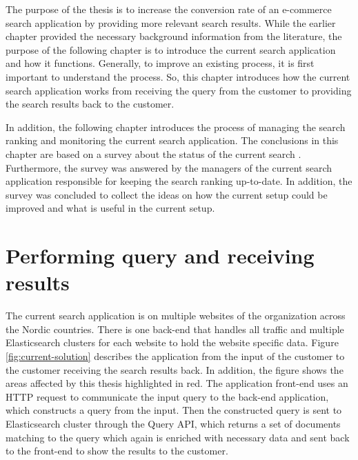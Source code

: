 
The purpose of the thesis is to increase the conversion rate of an e-commerce search application 
by providing more relevant search results. 
While the earlier chapter provided the necessary background information from the literature, the purpose
of the following chapter is to introduce the current search application and how it functions.
Generally, to improve an existing process, it is first important to understand the process. 
So, this chapter introduces how the current search application works
from receiving the query from the customer to providing the search results back to the customer. 


In addition, the following chapter introduces the process of managing 
the search ranking and monitoring the current search application.
The conclusions in this chapter are based on a survey about the status of the current search \cite{searchSurvey}.
Furthermore, the survey was answered by the managers of the current search application responsible for keeping
the search ranking up-to-date.
In addition, the survey was concluded to collect the ideas on how the current setup could be improved and 
what is useful in the current setup.


\section{Performing query and receiving results}

The current search application is on multiple websites of the organization across the Nordic countries. 
There is one back-end that handles all traffic and multiple Elasticsearch clusters for each website to 
hold the website specific data. Figure \ref{fig:current-solution} describes the application
from the input of the customer to the customer receiving the search results back.
In addition, the figure shows the areas affected by this thesis highlighted in red.
The application front-end uses an HTTP request to communicate the input query to the back-end application, 
which constructs a query from the input.
Then the constructed query is sent to Elasticsearch cluster through the Query API, which returns a set of documents
matching to the query which again is enriched with necessary data and sent back to the front-end to show the results
to the customer.



